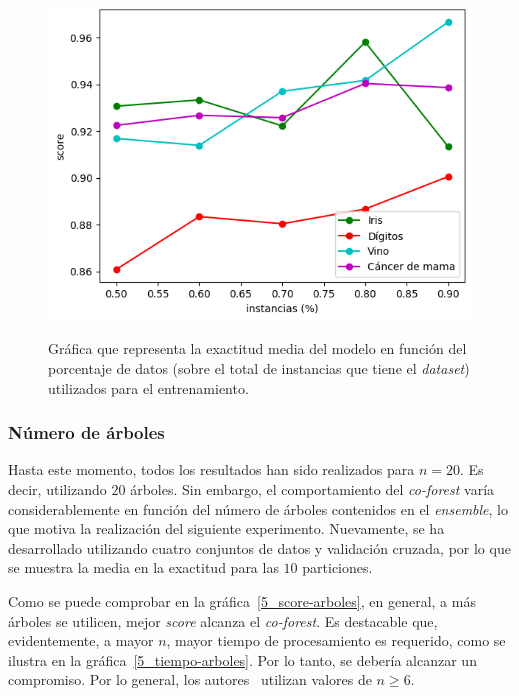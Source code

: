 \begin{figure}[h]
	\caption{Gráfica que representa la exactitud media del modelo en función del porcentaje de datos (sobre el total de instancias que tiene el \textit{dataset}) utilizados para el entrenamiento.}
	\centering
	\includegraphics[scale=0.7]{../img/memoria/5_score-porcentaje_entrenamiento}
	\label{5_score-porcentaje_entrenamiento}
\end{figure}

\subsubsection{Número de árboles}

Hasta este momento, todos los resultados han sido realizados para $n=20$. Es decir, utilizando $20$ árboles. Sin embargo, el comportamiento del \textit{co-forest} varía considerablemente en función del número de árboles contenidos en el \textit{ensemble}, lo que motiva la realización del siguiente experimento. Nuevamente, se ha desarrollado utilizando cuatro conjuntos de datos y validación cruzada, por lo que se muestra la media en la exactitud para las $10$ particiones.

Como se puede comprobar en la gráfica~\ref{5_score-arboles}, en general, a más árboles se utilicen, mejor \textit{score} alcanza el \textit{co-forest}. Es destacable que, evidentemente, a mayor $n$, mayor tiempo de procesamiento es requerido, como se ilustra en la gráfica~\ref{5_tiempo-arboles}. Por lo tanto, se debería alcanzar un compromiso. Por lo general, los autores~\cite{originalCoForest2007} utilizan valores de $n \geq 6$.

